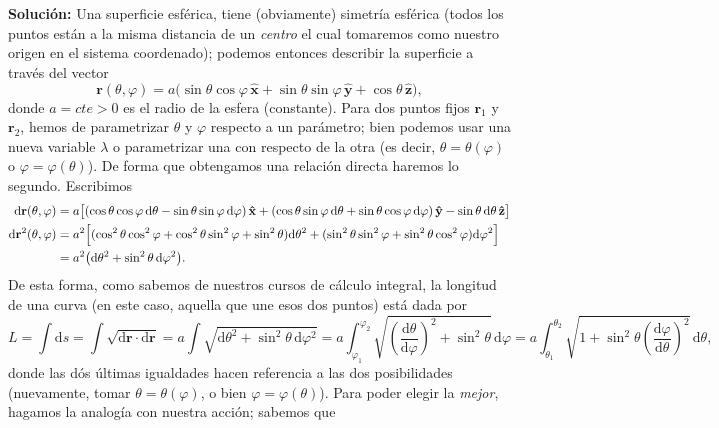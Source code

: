 \documentclass{article}
\begin{document}
\textcolor{Cinnabar}{\textbf{Soluci\'on:}} Una superficie esf\'erica, tiene (obviamente) simetr\'ia esf\'erica (todos los puntos est\'an a la misma distancia de un \textit{centro} el cual tomaremos como nuestro origen en el sistema coordenado); podemos entonces describir la superficie a trav\'es del vector
\begin{equation}
    \mathbf{r}(\theta,\varphi) = a\bigl(\sin\theta\cos\varphi\, \mathbf{\hat{x}} + \sin\theta\sin\varphi\, \mathbf{\hat{y}} + \cos\theta\, \mathbf{\hat{z}}\bigr),
\end{equation}
donde $a=cte>0$ es el radio de la esfera (constante). Para dos puntos fijos $\mathbf{r}_1$ y $\mathbf{r}_2$, hemos de parametrizar $\theta$ y $\varphi$ respecto a un par\'ametro; bien podemos usar una nueva variable $\lambda$ o parametrizar una con respecto de la otra (es decir, $\theta=\theta(\varphi)$ o $\varphi=\varphi(\theta)$). De forma que obtengamos una relaci\'on directa haremos lo segundo. Escribimos
\begin{align}
    \mathrm{d}\mathbf{r}(\theta,\varphi) &= a\bigl[(\cos\theta\cos\varphi\,\mathrm{d}\theta - \sin\theta\sin\varphi\,\mathrm{d}\varphi)\, \mathbf{\hat{x}} + (\cos\theta\sin\varphi\,\mathrm{d}\theta + \sin\theta\cos\varphi\,\mathrm{d}\varphi)\, \mathbf{\hat{y}} - \sin\theta\,\mathrm{d}\theta\, \mathbf{\hat{z}}\bigr] \nonumber \\
    \mathrm{d}\mathbf{r}^2(\theta,\varphi) &= a^2\Bigl[(\cos^2\theta\cos^2\varphi+\cos^2\theta\sin^2\varphi+\sin^2\theta)\mathrm{d}\theta^2 + (\sin^2\theta\sin^2\varphi+\sin^2\theta\cos^2\varphi)\mathrm{d}\varphi^2 \Bigr] \nonumber \\
    &=a^2\bigl(\mathrm{d}\theta^2+\sin^2\theta\,\mathrm{d}\varphi^2\bigr). \nonumber
\end{align}
De esta forma, como sabemos de nuestros cursos de c\'alculo integral, la longitud de una curva (en este caso, aquella que une esos dos puntos) est\'a dada por
\begin{equation*}
    L = \int\mathrm{d}s = \int \sqrt{\mathrm{d}\mathbf{r} \cdot \mathrm{d}\mathbf{r}} = a \int \sqrt{\mathrm{d}\theta^2+\sin^2\theta\,\mathrm{d}\varphi^2} 
    = a \int_{\varphi_1}^{\varphi_2} \sqrt{\left(\frac{\mathrm{d}\theta}{\mathrm{d}\varphi}\right)^2+\sin^2\theta} \,\mathrm{d}\varphi 
    = a \int_{\theta_1}^{\theta_2} \sqrt{1+\sin^2\theta \left(\frac{\mathrm{d}\varphi}{\mathrm{d}\theta}\right)^2} \,\mathrm{d}\theta,
\end{equation*}
donde las d\'os \'ultimas igualdades hacen referencia a las dos posibilidades (nuevamente, tomar $\theta=\theta(\varphi)$, o bien $\varphi=\varphi(\theta)$). Para poder elegir la \textit{mejor}, hagamos la analog\'ia con nuestra acci\'on; sabemos que
\end{document}
